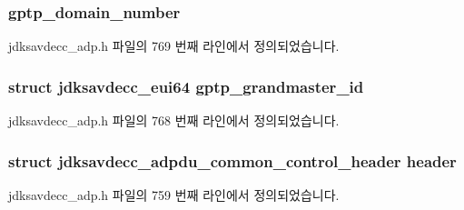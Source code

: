 \subsubsection[{\texorpdfstring{gptp\+\_\+domain\+\_\+number}{gptp_domain_number}}]{ gptp\+\_\+domain\+\_\+number}\hypertarget{structjdksavdecc__adpdu_ac53b4e61c0f960e16c86cfe678ca256d}{}\label{structjdksavdecc__adpdu_ac53b4e61c0f960e16c86cfe678ca256d}


jdksavdecc\+\_\+adp.\+h 파일의 769 번째 라인에서 정의되었습니다.

\subsubsection[{\texorpdfstring{gptp\+\_\+grandmaster\+\_\+id}{gptp_grandmaster_id}}]{\setlength{\rightskip}{0pt plus 5cm}struct {\bf jdksavdecc\+\_\+eui64} gptp\+\_\+grandmaster\+\_\+id}\hypertarget{structjdksavdecc__adpdu_a34b9bb3bd1ced443f07d42e42d8e9704}{}\label{structjdksavdecc__adpdu_a34b9bb3bd1ced443f07d42e42d8e9704}


jdksavdecc\+\_\+adp.\+h 파일의 768 번째 라인에서 정의되었습니다.

\subsubsection[{\texorpdfstring{header}{header}}]{\setlength{\rightskip}{0pt plus 5cm}struct {\bf jdksavdecc\+\_\+adpdu\+\_\+common\+\_\+control\+\_\+header} header}\hypertarget{structjdksavdecc__adpdu_a250e8a37ff2e4ef65d00d9175619a72a}{}\label{structjdksavdecc__adpdu_a250e8a37ff2e4ef65d00d9175619a72a}


jdksavdecc\+\_\+adp.\+h 파일의 759 번째 라인에서 정의되었습니다.

